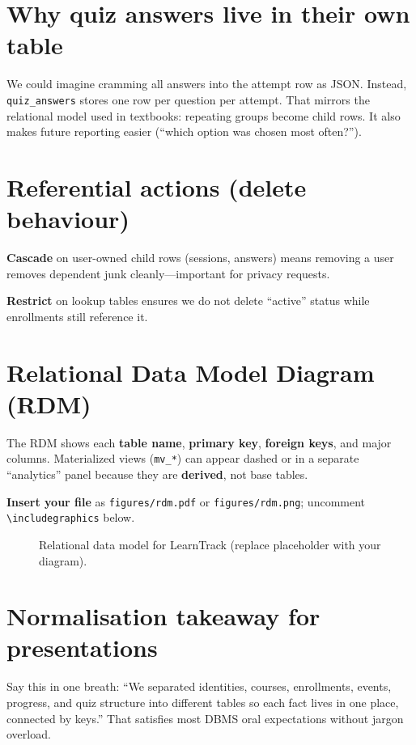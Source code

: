 \section{Why quiz answers live in their own table}
We could imagine cramming all answers into the attempt row as JSON. Instead, \texttt{quiz\_answers} stores one row per question per attempt. That mirrors the relational model used in textbooks: repeating groups become child rows. It also makes future reporting easier (``which option was chosen most often?'').

\section{Referential actions (delete behaviour)}
\textbf{Cascade} on user-owned child rows (sessions, answers) means removing a user removes dependent junk cleanly---important for privacy requests.

\textbf{Restrict} on lookup tables ensures we do not delete ``active'' status while enrollments still reference it.

\section{Relational Data Model Diagram (RDM)}
\label{sec:rdm-fig}

The RDM shows each \textbf{table name}, \textbf{primary key}, \textbf{foreign keys}, and major columns. Materialized views (\texttt{mv\_*}) can appear dashed or in a separate ``analytics'' panel because they are \textbf{derived}, not base tables.

\textbf{Insert your file} as \texttt{figures/rdm.pdf} or \texttt{figures/rdm.png}; uncomment \texttt{\textbackslash includegraphics} below.

\begin{figure}[htbp]
  \centering
  \caption{Relational data model for LearnTrack (replace placeholder with your diagram).}
  \label{fig:rdm}
\end{figure}

\section{Normalisation takeaway for presentations}
Say this in one breath: ``We separated identities, courses, enrollments, events, progress, and quiz structure into different tables so each fact lives in one place, connected by keys.'' That satisfies most DBMS oral expectations without jargon overload.
